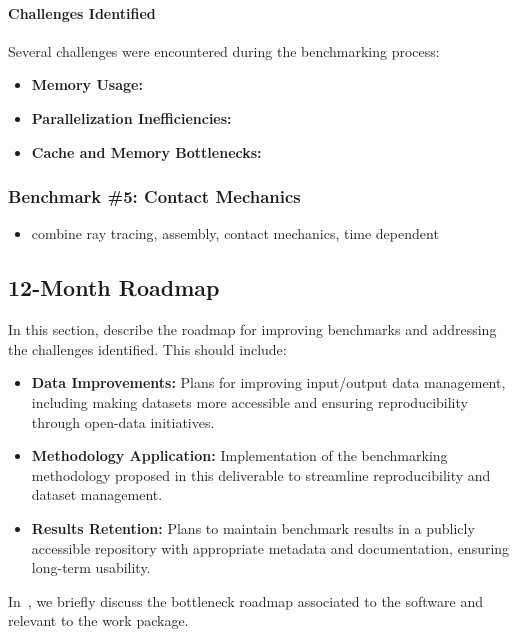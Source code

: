 \paragraph{Challenges Identified}
Several challenges were encountered during the benchmarking process:
\begin{itemize}
    \item \textbf{Memory Usage:}
    \item \textbf{Parallelization Inefficiencies:}
    \item \textbf{Cache and Memory Bottlenecks:}
\end{itemize}



\subsubsection{Benchmark \#5: Contact Mechanics}

\begin{itemize}
    \item combine ray tracing, assembly, contact mechanics, time dependent
\end{itemize}

\subsection{12-Month Roadmap}
\label{sec:WP1:Feelpp:roadmap}

In this section, describe the roadmap for improving benchmarks and addressing the challenges identified. This should include:
\begin{itemize}
    \item \textbf{Data Improvements:} Plans for improving input/output data management, including making datasets more accessible and ensuring reproducibility through open-data initiatives.
    \item \textbf{Methodology Application:} Implementation of the benchmarking methodology proposed in this deliverable to streamline reproducibility and dataset management.
    \item \textbf{Results Retention:} Plans to maintain benchmark results in a publicly accessible repository with appropriate metadata and documentation, ensuring long-term usability.
\end{itemize}

In~, we briefly discuss the bottleneck roadmap associated to the software and relevant to the work package.

